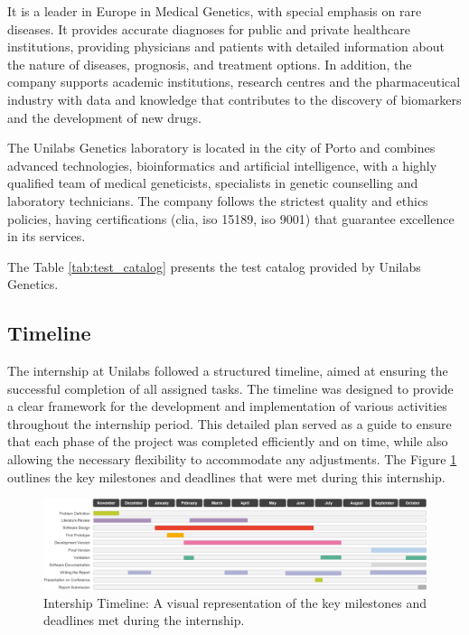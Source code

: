 It is a leader in Europe in Medical Genetics, with special emphasis on rare diseases. It provides accurate diagnoses for public and private healthcare institutions, providing physicians and patients with detailed information about the nature of diseases, prognosis, and treatment options. In addition, the company supports academic institutions, research centres and the pharmaceutical industry with data and knowledge that contributes to the discovery of biomarkers and the development of new drugs. 

The Unilabs Genetics laboratory is located in the city of Porto and combines advanced technologies, bioinformatics and artificial intelligence, with a highly qualified team of medical geneticists, specialists in genetic counselling and laboratory technicians. The company follows the strictest quality and ethics policies, having certifications (\ac{clia}, \ac{iso} 15189, \ac{iso} 9001) that guarantee excellence in its services. \cite{unilabs_genetica}

The Table \ref{tab:test_catalog} presents the test catalog provided by Unilabs Genetics.

\subsection{Timeline} \label{subsec:timeline}
The internship at Unilabs followed a structured timeline, aimed at ensuring the successful completion of all assigned tasks. The timeline was designed to provide a clear framework for the development and implementation of various activities throughout the internship period. This detailed plan served as a guide to ensure that each phase of the project was completed efficiently and on time, while also allowing the necessary flexibility to accommodate any adjustments. The Figure \ref{fig:timeline} outlines the key milestones and deadlines that were met during this internship.

\begin{figure}[H]
    \centering
    \includegraphics[width=1\textwidth]{figs/timeline2.png}
    \caption{Intership Timeline: A visual representation of the key milestones and deadlines met during the internship.}
    \label{fig:timeline}
\end{figure}

